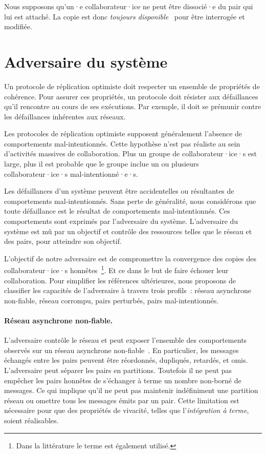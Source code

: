 Nous supposons qu'un·e collaborateur·ice ne peut être dissocié·e du pair qui lui est attaché.
La copie est donc \emph{toujours disponible}~\autocite{mahajan_2011_cac} pour être interrogée et modifiée.


\section{Adversaire du système}

Un protocole de réplication optimiste doit respecter un ensemble de propriétés de cohérence.
Pour assurer ces propriétés, un protocole doit résister aux défaillances qu'il rencontre au cours de ses exécutions.
Par exemple, il doit se prémunir contre les défaillances inhérentes aux réseaux.

Les protocoles de réplication optimiste supposent généralement l'absence de comportements mal-intentionnés.
Cette hypothèse n'est pas réaliste au sein d'activités massives de collaboration.
Plus un groupe de collaborateur·ice·s est large, plus il est probable que le groupe inclue un ou plusieurs collaborateur·ice·s mal-intentionné·e·s.

Les défaillances d'un système peuvent être accidentelles ou résultantes de comportements mal-intentionnés.
Sans perte de généralité, nous considérons que toute défaillance est le résultat de comportements mal-intentionnés.
Ces comportements sont exprimés par l'adversaire du système.
L'adversaire du système est mû par un objectif et contrôle des ressources telles que le réseau et des pairs, pour atteindre son objectif.

L'objectif de notre adversaire est de compromettre la convergence des copies des collaborateur·ice·s honnêtes~\footnote{Dans la littérature le terme  est également utilisé.}.
Et ce dans le but de faire échouer leur collaboration.
Pour simplifier les références ultérieures, nous proposons de classifier les capacités de l'adversaire à travers trois profils~: réseau asynchrone non-fiable, réseau corrompu, pairs perturbés, pairs mal-intentionnés.

\paragraph{Réseau asynchrone non-fiable.} L'adversaire contrôle le réseau et peut exposer l'ensemble des comportements observés sur un réseau asynchrone non-fiable~\autocite{lynch_1996_asyncnet}.
En particulier, les messages échangés entre les pairs peuvent être réordonnés, dupliqués, retardés, et omis.
L'adversaire peut séparer les pairs en partitions.
Toutefois il ne peut pas empêcher les pairs honnêtes de s'échanger à terme un nombre non-borné de messages.
Ce qui implique qu'il ne peut pas maintenir indéfiniment une partition réseau ou omettre tous les messages émits par un pair.
Cette limitation est nécessaire pour que des propriétés de vivacité, telles que l'\emph{intégration à terme}, soient réalisables.

